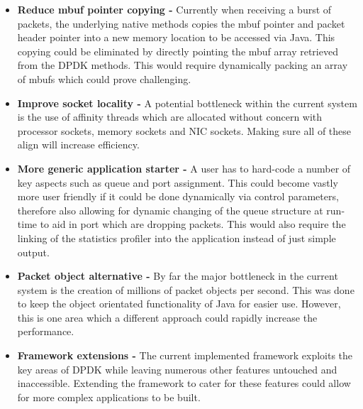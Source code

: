 \documentclass[final_report.tex]{subfiles}
\begin{document}
\begin{itemize}
	\item \textbf{Reduce mbuf pointer copying -} Currently when receiving a burst of packets, the underlying native methods copies the mbuf pointer and packet header pointer into a new memory location to be accessed via Java. This copying could be eliminated by directly pointing the mbuf array retrieved from the DPDK methods. This would require dynamically packing an array of mbufs which could prove challenging.
	\item \textbf{Improve socket locality -} A potential bottleneck within the current system is the use of affinity threads which are allocated without concern with processor sockets, memory sockets and NIC sockets. Making sure all of these align will increase efficiency.
	\item \textbf{More generic application starter -} A user has to hard-code a number of key aspects such as queue and port assignment. This could become vastly more user friendly if it could be done dynamically via control parameters, therefore also allowing for dynamic changing of the queue structure at run-time to aid in port which are dropping packets. This would also require the linking of the statistics profiler into the application instead of just simple output.
	\item \textbf{Packet object alternative -} By far the major bottleneck in the current system is the creation of millions of packet objects per second. This was done to keep the object orientated functionality of Java for easier use. However, this is one area which a different approach could rapidly increase the performance.
	\item \textbf{Framework extensions -} The current implemented framework exploits the key areas of DPDK while leaving numerous other features untouched and inaccessible. Extending the framework to cater for these features could allow for more complex applications to be built.
\end{itemize}
\end{document}

